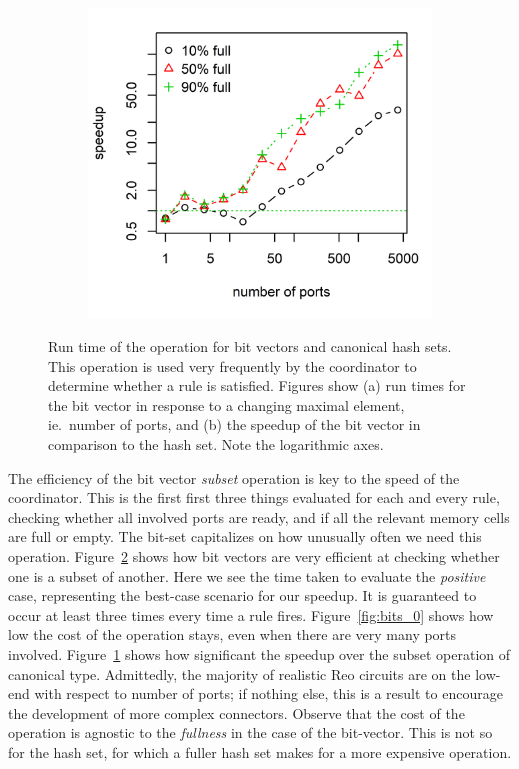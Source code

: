 \begin{figure}
{\begin{subfigure}[b]{0.63\textwidth}
			\includegraphics[width=\textwidth]{experiments/bits_1.png}
			\caption{}
			\label{fig:bits_1}
		\end{subfigure}%
	}
	\caption[Bit vector speedup over hashset.]{Run time of the  operation for bit vectors and canonical hash sets. This operation is used very frequently by the coordinator to determine whether a rule is satisfied. Figures show (a) run times for the bit vector in response to a changing maximal element, ie.\ number of ports, and (b) the speedup of the bit vector in comparison to the hash set. Note the logarithmic axes.}
	\label{fig:bits}
\end{figure}



The efficiency of the bit vector \textit{subset} operation is key to the speed of the coordinator. This is the first first three things evaluated for each and every rule, checking whether all involved ports are ready, and if all the relevant memory cells are full or empty. The bit-set capitalizes on how unusually often we need this operation. Figure~\ref{fig:bits} shows how bit vectors are very efficient at checking whether one is a subset of another. Here we see the time taken to evaluate the \textit{positive} case, representing the best-case scenario for our speedup. It is guaranteed to occur at least three times every time a rule fires. Figure~\ref{fig:bits_0} shows how low the cost of the operation stays, even when there are very many ports involved. Figure~\ref{fig:bits_1} shows how significant the speedup over the subset operation of canonical  type. Admittedly, the majority of realistic Reo circuits are on the low-end with respect to number of ports; if nothing else, this is a result to encourage the development of more complex connectors. Observe that the cost of the operation is agnostic to the \textit{fullness} in the case of the bit-vector. This is not so for the hash set, for which a fuller hash set makes for a more expensive operation. 



